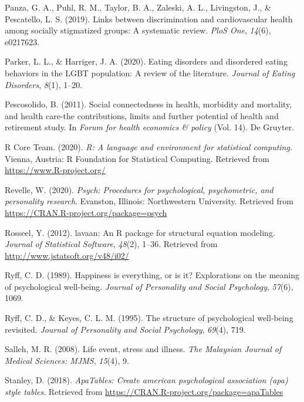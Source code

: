 \documentclass[
  english,
  man,floatsintext]{apa6}
\begin{document}
\begin{CSLReferences}{1}{0}
\leavevmode\hypertarget{ref-panza2019}{}%
Panza, G. A., Puhl, R. M., Taylor, B. A., Zaleski, A. L., Livingston, J., \& Pescatello, L. S. (2019). Links between discrimination and cardiovascular health among socially stigmatized groups: A systematic review. \emph{PloS One}, \emph{14}(6), e0217623.

\leavevmode\hypertarget{ref-parker2020}{}%
Parker, L. L., \& Harriger, J. A. (2020). Eating disorders and disordered eating behaviors in the LGBT population: A review of the literature. \emph{Journal of Eating Disorders}, \emph{8}(1), 1--20.

\leavevmode\hypertarget{ref-pescosolido2011}{}%
Pescosolido, B. (2011). Social connectedness in health, morbidity and mortality, and health care-the contributions, limits and further potential of health and retirement study. In \emph{Forum for health economics \& policy} (Vol. 14). De Gruyter.

\leavevmode\hypertarget{ref-R-base}{}%
R Core Team. (2020). \emph{R: A language and environment for statistical computing}. Vienna, Austria: R Foundation for Statistical Computing. Retrieved from \url{https://www.R-project.org/}

\leavevmode\hypertarget{ref-R-psych}{}%
Revelle, W. (2020). \emph{Psych: Procedures for psychological, psychometric, and personality research}. Evanston, Illinois: Northwestern University. Retrieved from \url{https://CRAN.R-project.org/package=psych}

\leavevmode\hypertarget{ref-R-lavaan}{}%
Rosseel, Y. (2012). lavaan: An R package for structural equation modeling. \emph{Journal of Statistical Software}, \emph{48}(2), 1--36. Retrieved from \url{http://www.jstatsoft.org/v48/i02/}

\leavevmode\hypertarget{ref-ryff1989}{}%
Ryff, C. D. (1989). Happiness is everything, or is it? Explorations on the meaning of psychological well-being. \emph{Journal of Personality and Social Psychology}, \emph{57}(6), 1069.

\leavevmode\hypertarget{ref-ryffkeyes1995}{}%
Ryff, C. D., \& Keyes, C. L. M. (1995). The structure of psychological well-being revisited. \emph{Journal of Personality and Social Psychology}, \emph{69}(4), 719.

\leavevmode\hypertarget{ref-salleh2008}{}%
Salleh, M. R. (2008). Life event, stress and illness. \emph{The Malaysian Journal of Medical Sciences: MJMS}, \emph{15}(4), 9.

\leavevmode\hypertarget{ref-R-apaTables}{}%
Stanley, D. (2018). \emph{ApaTables: Create american psychological association (apa) style tables}. Retrieved from \url{https://CRAN.R-project.org/package=apaTables}


\end{CSLReferences}
\end{document}
